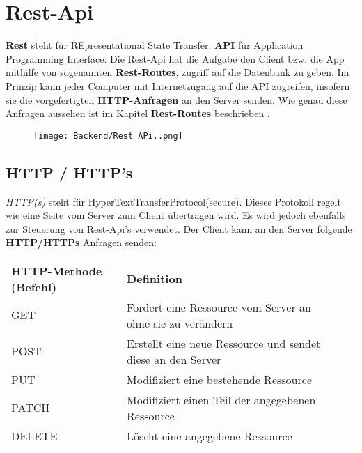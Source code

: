 \section{Rest-Api}
\label{restapi}

\textbf{Rest} steht für REpresentational State Transfer, \textbf{API} für Application
Programming Interface. Die Rest-Api hat die Aufgabe den Client bzw. die App
mithilfe von sogenannten \textbf{Rest-Routes}, zugriff auf die Datenbank zu geben.
Im Prinzip kann jeder Computer mit Internetzugang auf die API zugreifen, insofern
sie die vorgefertigten \textbf{HTTP-Anfragen} an den Server senden. Wie genau diese
Anfragen aussehen ist im Kapitel \textbf{Rest-Routes} beschrieben \underline{}.

\begin{figure}[H]
    \begin{center}
        \texttt{[image: Backend/Rest APi..png]}
    \end{center}
\end{figure}

\subsection{HTTP / HTTP's}
\textit{HTTP(s)} steht für HyperTextTransferProtocol(secure).
Dieses Protokoll regelt wie eine Seite vom Server zum Client übertragen wird.
Es wird jedoch ebenfalls zur Steuerung von Rest-Api's verwendet. Der Client
kann an den Server folgende \textbf{HTTP/HTTPs} Anfragen senden:

\begin{table}
    \centering
    \begin{tabular}{llll}
        \textbf{HTTP-Methode (Befehl)} & \textbf{Definition}                                         &  & \\
        GET                            & Fordert eine Ressource vom Server an ohne sie zu verändern  &  & \\
        POST                           & Erstellt eine neue Ressource und sendet diese an den Server &  & \\
        PUT                            & Modifiziert eine bestehende Ressource                       &  & \\
        PATCH                          & Modifiziert einen Teil der angegebenen Ressource            &  & \\
        DELETE                         & Löscht eine angegebene Ressource                            &  &
    \end{tabular}
\end{table}

